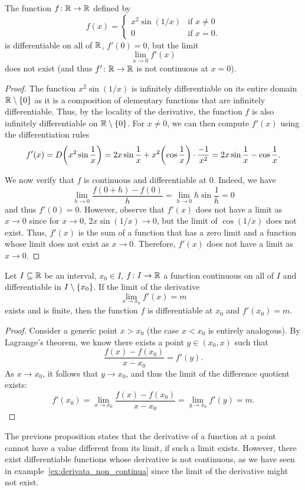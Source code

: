 \begin{example}
\label{ex:derivata_non_continua}%
\mymark{**}%
%
%
The function $f\colon {\mathbb R} \to {\mathbb R}$ defined by
\[
  f(x)
  = \begin{cases}
    x^2 \sin(1/x) & \text{if $x \neq 0$} \\
    0 & \text{if $x=0$.}
  \end{cases}
\]
is differentiable on all of ${\mathbb R}$, $f'(0)=0$, but the limit
\[
\lim_{x\to 0} f'(x)
\]
does not exist (and thus $f'\colon {\mathbb R}\to{\mathbb R}$ is not continuous at $x=0$).
\end{example}
%
\begin{proof}
The function $x^2 \sin(1/x)$ is infinitely differentiable on its entire domain
${\mathbb R}\setminus{\left\{ 0 \right\}}$ as it is a composition of elementary functions that
are infinitely differentiable.
Thus, by the locality of the derivative, the function $f$ is also infinitely
differentiable on ${\mathbb R}\setminus{\left\{ 0 \right\}}$.
For $x\neq 0$, we can then compute $f'(x)$ using the differentiation rules
\[
  f'(x)
  = D {\left( x^2\sin \frac 1 x \right)}
  = 2x \sin \frac 1 x + x^2 {\left( \cos \frac 1 x \right)} \cdot\frac{-1}{x^2}
  = 2x \sin \frac 1 x - \cos \frac 1 x.
\]

We now verify that $f$ is continuous and differentiable at $0$.
Indeed, we have
\[
 \lim_{h\to 0}\frac{f(0+h)-f(0)}{h}
 = \lim_{h\to 0} h \sin \frac 1 h = 0
\]
and thus $f'(0) = 0$.
However, observe that $f'(x)$ does not have a limit as $x\to 0$
since for $x \to 0$, $2x \sin(1/x) \to 0$, but the limit of $\cos (1/x)$ does
not exist. Thus, $f'(x)$ is the sum of a function that has a zero limit and a
function whose limit does not exist as $x\to 0$. Therefore, $f'(x)$ does not
have a limit as $x\to 0$.
\end{proof}

\begin{proposition}%
\label{prop:4384774}\mymark{**}%
Let $I\subseteq {\mathbb R}$ be an interval, $x_0\in I$,
$f\colon I \to {\mathbb R}$ a function continuous on all of $I$ 
and differentiable in $I\setminus{\left\{ x_0 \right\}}$.
If the limit of the derivative
\[
  \lim_{x\to x_0} f'(x) = m
\]
exists and is finite, then the function $f$ is differentiable at $x_0$ and
$f'(x_0) = m$.
\end{proposition}
%
\begin{proof}
\mymark{*}
Consider a generic point $x>x_0$ (the case $x<x_0$ is entirely analogous).
By Lagrange's theorem, we know there exists a point $y\in (x_0,x)$ such that
\[
  \frac{f(x)-f(x_0)}{x-x_0} = f'(y).
\]
As $x\to x_0$, it follows that $y\to x_0$, and thus
the limit of the difference quotient exists:
\[
  f'(x_0) = \lim_{x\to x_0} \frac{f(x)-f(x_0)}{x-x_0}
  = \lim_{y\to x_0} f'(y) = m.
\]
\end{proof}
%
The previous proposition states that the derivative of a function at a
point cannot have a value different from its limit, if such a limit exists.
However, there exist differentiable functions whose derivative is not
continuous, as we have seen
in example~\ref{ex:derivata_non_continua}
since the limit of the derivative might not exist.